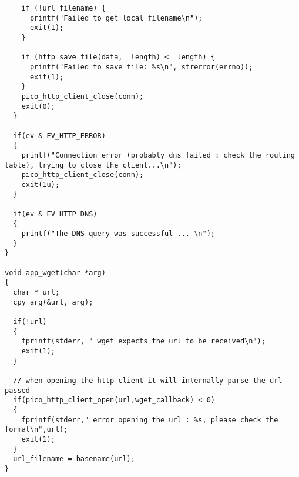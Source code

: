 \begin{verbatim}
    if (!url_filename) {
      printf("Failed to get local filename\n");
      exit(1);
    }

    if (http_save_file(data, _length) < _length) {
      printf("Failed to save file: %s\n", strerror(errno));
      exit(1);
    }
    pico_http_client_close(conn);
    exit(0);
  }

  if(ev & EV_HTTP_ERROR)
  {
    printf("Connection error (probably dns failed : check the routing table), trying to close the client...\n");
    pico_http_client_close(conn);
    exit(1u);
  }

  if(ev & EV_HTTP_DNS)
  {
    printf("The DNS query was successful ... \n");
  }
}

void app_wget(char *arg)
{
  char * url;
  cpy_arg(&url, arg);

  if(!url)
  {
    fprintf(stderr, " wget expects the url to be received\n");
    exit(1);
  }
  
  // when opening the http client it will internally parse the url passed
  if(pico_http_client_open(url,wget_callback) < 0)
  {
    fprintf(stderr," error opening the url : %s, please check the format\n",url);
    exit(1);
  }
  url_filename = basename(url);
}
\end{verbatim}

